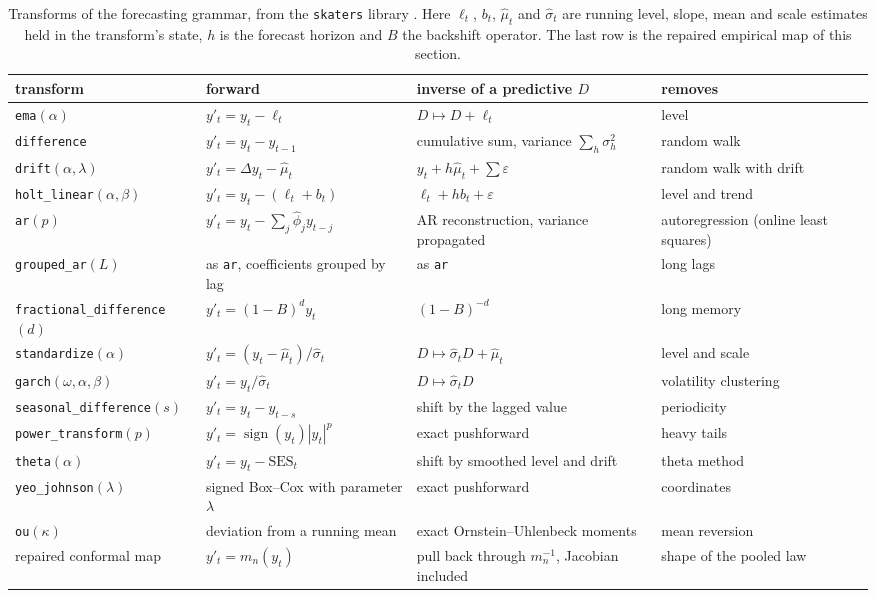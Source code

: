 \documentclass[11pt]{article}
\theoremstyle{remark}
\begin{document}
\begin{table}[t]
\centering
\small
\setlength{\tabcolsep}{4pt}
\begin{tabular}{@{}lp{}p{}p{}@{}}
\toprule
transform & forward & inverse of a predictive $D$ & removes \\
\midrule
\texttt{ema}$(\alpha)$ & $y'_t=y_t-\ell_t$ & $D\mapsto D+\ell_t$ & level \\
\texttt{difference} & $y'_t=y_t-y_{t-1}$ & cumulative sum, variance $\sum_h\sigma_h^2$ & random walk \\
\texttt{drift}$(\alpha,\lambda)$ & $y'_t=\Delta y_t-\hat\mu_t$ & $y_t+h\hat\mu_t+\sum\varepsilon$ & random walk with drift \\
\texttt{holt\_linear}$(\alpha,\beta)$ & $y'_t=y_t-(\ell_t+b_t)$ & $\ell_t+hb_t+\varepsilon$ & level and trend \\
\texttt{ar}$(p)$ & $y'_t=y_t-\sum_j\hat\phi_jy_{t-j}$ & AR reconstruction, variance propagated & autoregression (online least squares) \\
\texttt{grouped\_ar}$(L)$ & as \texttt{ar}, coefficients grouped by lag & as \texttt{ar} & long lags \\
\texttt{fractional\_difference}$(d)$ & $y'_t=(1-B)^dy_t$ & $(1-B)^{-d}$ & long memory \\
\texttt{standardize}$(\alpha)$ & $y'_t=(y_t-\hat\mu_t)/\hat\sigma_t$ & $D\mapsto\hat\sigma_tD+\hat\mu_t$ & level and scale \\
\texttt{garch}$(\omega,\alpha,\beta)$ & $y'_t=y_t/\hat\sigma_t$ & $D\mapsto\hat\sigma_tD$ & volatility clustering \\
\texttt{seasonal\_difference}$(s)$ & $y'_t=y_t-y_{t-s}$ & shift by the lagged value & periodicity \\
\texttt{power\_transform}$(p)$ & $y'_t=\operatorname{sign}(y_t)|y_t|^p$ & exact pushforward & heavy tails \\
\texttt{theta}$(\alpha)$ & $y'_t=y_t-\mathrm{SES}_t$ & shift by smoothed level and drift & theta method \\
\texttt{yeo\_johnson}$(\lambda)$ & signed Box--Cox with parameter $\lambda$ & exact pushforward & coordinates \\
\texttt{ou}$(\kappa)$ & deviation from a running mean & exact Ornstein--Uhlenbeck moments & mean reversion \\
\midrule
repaired conformal map & $y'_t=m_n(y_t)$ & pull back through $m_n^{-1}$, Jacobian included & shape of the pooled law \\
\bottomrule
\end{tabular}
\caption{Transforms of the forecasting grammar, from the \texttt{skaters} library
\citep{cotton2026transforms}. Here $\ell_t$, $b_t$, $\hat\mu_t$ and $\hat\sigma_t$
are running level, slope, mean and scale estimates held in the transform's state,
$h$ is the forecast horizon and $B$ the backshift operator. The last row is the
repaired empirical map of this section.}
\label{tab:transforms}
\end{table}
\end{document}

